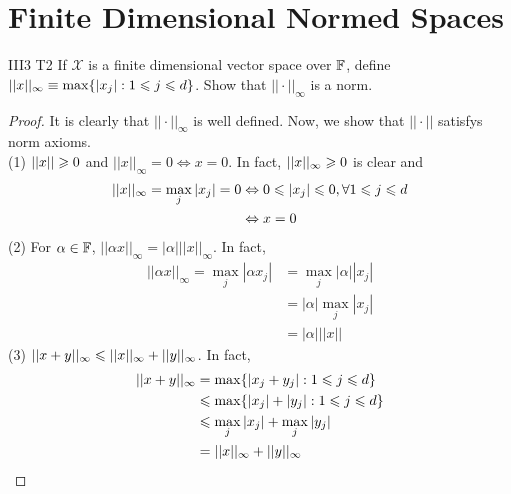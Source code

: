 \chapter{Finite Dimensional Normed Spaces}\label{chp:3_3}

\begin{exercise}{III3 T2}{}
    If $\mathscr{X}$ is a finite dimensional vector space over $\mathbb{F}$, define $||x||_{\infty}\equiv \max\{|x_j|:1\leqslant j\leqslant d\}$.
    Show that $||\cdot||_{\infty}$ is a norm.
\end{exercise}

\begin{proof}
    It is clearly that $||\cdot||_{\infty}$ is well defined.
    Now, we show that $||\cdot||$ satisfys norm axioms.\\
    (1) $||x||\geqslant 0$ and $||x||_{\infty}=0\Leftrightarrow x=0$. In fact, $||x||_{\infty}\geqslant 0$ is clear and 
    \begin{align*}
        ||x||_{\infty}=\max_{j}|x_j|=0&\Leftrightarrow 0\leqslant |x_j|\leqslant 0,\forall 1\leqslant j\leqslant d\\
                        &\Leftrightarrow x=0
    \end{align*}
    (2) For $\alpha\in\mathbb{F}$, $||\alpha x||_{\infty}=|\alpha|||x||_{\infty}$. In fact, 
    \begin{align*}
        ||\alpha x||_{\infty}= \max_{j}|\alpha x_j|&= \max_{j}|\alpha||x_j|\\
                            &= |\alpha|\max_{j}|x_j|\\
                            &= |\alpha|||x||
    \end{align*}
    (3) $||x+y||_{\infty}\leqslant ||x||_{\infty}+||y||_{\infty}$. In fact, 
    \begin{align*}
        ||x+y||_{\infty}&=\max\{|x_j+y_j|:1\leqslant j\leqslant d\}\\
                        &\leqslant \max \{|x_j|+|y_j|:1\leqslant j\leqslant d\}\\
                        &\leqslant \max_{j}|x_j| +\max_{j}|y_j|\\
                        &=||x||_{\infty} + ||y||_{\infty}
    \end{align*}
\end{proof}